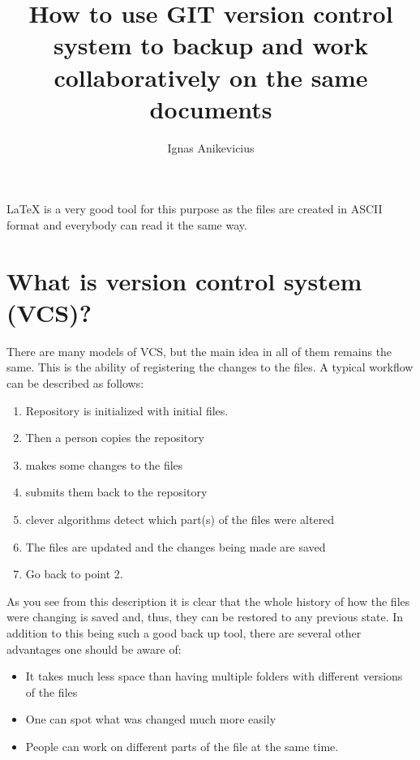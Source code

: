 \documentclass[
    draft
]{scrartcl}
\title{How to use GIT version control system to backup and work collaboratively
on the same documents}
\author{Ignas Anikevicius}
\begin{document}
\maketitle

\LaTeX{} is a very good tool for this purpose as the files are created in ASCII
    format and everybody can read it the same way.
%
\tableofcontents
\listoftodos
\clearpage

\section{What is version control system (VCS)?}

There are many models of VCS, but the main idea in all of them remains the same.
%
This is the ability of registering the changes to the files. 
%
A typical workflow can be described as follows:
\begin{enumerate}
    \item Repository is initialized with initial files.
    \item Then a person copies the repository
    \item makes some changes to the files
    \item submits them back to the repository 
    \item clever algorithms detect  which part(s) of the files were altered 
    \item The files are updated and the changes being made are saved
    \item Go back to point 2.
\end{enumerate}

As you see from this description it is clear that the whole history of how the
    files were changing is saved and, thus, they can be restored to any previous
    state.
%
In addition to this being such a good back up tool, there are several
    other advantages one should be aware of:
%
\begin{itemize}
    \item It takes much less space than having multiple folders with different
        versions of the files
    \item One can spot what was changed much more easily
    \item People can work on different parts of the file at the same time.
\end{itemize}
\end{document}
